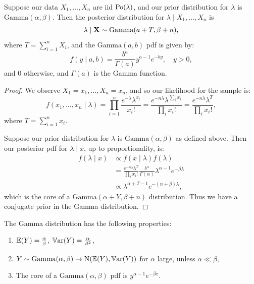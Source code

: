\documentclass[10pt, a4paper]{article}
\begin{document}
\begin{theorem}
    Suppose our data $X_1, \dotsc, X_n$ are iid $\operatorname{Po}(\lambda)$,
    and our prior distribution for $\lambda$ is $\mathrm{Gamma}(\alpha, \beta)$.
    Then the posterior distribution for $\lambda \mid X_1, \dotsc, X_n$ is
    \[
    \lambda \mid \mathbf{X} \sim \mathrm{Gamma}(a + T, \beta + n),
    \]
    where $T = \sum_{i = 1}^{n}X_i$,
    and the $\mathrm{Gamma}(a, b)$ pdf is given by:
    \[
    f(y\mid a, b) = \frac{b ^ {a}}{\Gamma(a)}y ^ {a - 1}e ^ {-by},\quad y > 0,
    \]
    and $0$ otherwise,
    and $\Gamma(a)$ is the Gamma function.

    \begin{proof}
        We observe $X_1 = x_1, \dotsc, X_n = x_n$,
        and so our likelihood for the sample is:
        \[
        f(x_1, \dotsc, x_n\mid\lambda) = \prod_{i = 1}^{n}\frac{e ^ {-\lambda}\lambda ^ {x_i}}{x_i!} = \frac{e ^ {-n\lambda}\lambda ^ {\sum_{i}x_i}}{\prod_{i}x_i!} = \frac{e ^ {-n\lambda}\lambda ^ T}{\prod_{i}x_i!},
        \]
        where $T = \sum_{i = 1}^{n}x_i$.

        Suppose our prior distribution for $\lambda$ is $\mathrm{Gamma}(\alpha, \beta)$ as defined above.
        Then our posterior pdf for $\lambda \mid x$,
        up to proportionality,
        is:
        \begin{align*}
            f(\lambda \mid x) &\propto f(x\mid \lambda)f(\lambda) \\
            &= \frac{e ^ {-n\lambda}\lambda ^ T}{\prod_{i}x_i!}\frac{b ^ {\alpha}}{\Gamma(\alpha)}\lambda ^ {\alpha - 1}e ^ {-\beta\lambda} \\
            &\propto \lambda ^ {\alpha + T - 1}e ^ {-(n + \beta)\lambda},
        \end{align*}
        which is the core of a $\mathrm{Gamma}(\alpha + Y, \beta + n)$ distribution.
        Thus we have a conjugate prior in the Gamma distribution.
    \end{proof}
\end{theorem}

\begin{remark}
    The Gamma distribution has the following properties:
    \begin{enumerate}[label = \arabic*.]
        \item $\mathbb{E}(Y) = \frac{\alpha}{\beta}$,
        $\mathbb{V}\mathrm{ar}(Y) = \frac{\alpha}{\beta ^ 2}$,

        \item $Y \sim \mathrm{Gamma}(\alpha, \beta) \to \mathrm{N}(\mathbb{E}(Y), \mathbb{V}\mathrm{ar}(Y))$ for $\alpha$ large,
        unless $\alpha \ll \beta$,

        \item The core of a $\mathrm{Gamma}(\alpha, \beta)$ pdf is $y ^ {\alpha - 1}e ^ {-\beta x}$.
    \end{enumerate}
\end{remark}
\end{document}
